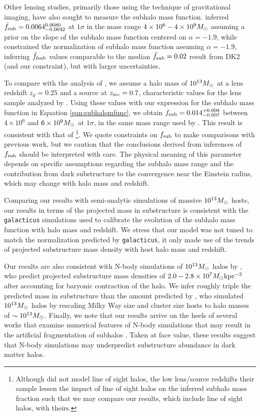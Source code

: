 Other lensing studies, primarily those using the technique of gravitational imaging, have also sought to measure the subhalo mass function. \cite{Veg++14} inferred ${\bar{f}_{\rm{sub}}}= 0.0064_{-0.0042}^{0.0080}$ at $1 \sigma$ in the mass range $4 \times 10^6 - 4 \times 10^9 {M_{\odot}}$ assuming a prior on the slope of the subhalo mass function centered on $\alpha = -1.9$, while \cite{Hezaveh++16} constrained the normalization of subhalo mass function assuming $\alpha = -1.9$, inferring $\bar{f}_{\rm{fsub}}$ values comparable to the median $\bar{f}_{\rm{sub}} = 0.02$ result from DK2 (and our constraint), but with larger uncertainties. 

To compare with the analysis of \cite{Veg++14}, we assume a halo mass of $10^{13}{M_{\odot}}$ at a lens redshift $z_d = 0.25$ and a source at $z_{\rm{src}} = 0.7$, characteristic values for the lens sample analyzed by \cite{Veg++14}. Using these values with our expression for the subhalo mass function in Equation \ref{eqn:subhalomfunc}, we obtain ${{f}_{\rm{sub}}}= 0.014_{-0.007}^{+0.008}$ between $4 \times 10^6$ and $6 \times 10^9 {M_{\odot}}$ at $1 \sigma$, in the same mass range used by \cite{Veg++14}. This result is consistent with that of \cite{Veg++14}\footnote{Although \cite{Veg++14} did not model line of sight halos, the low lens/source redshifts their sample lessen the impact of line of sight halos on the inferred subhalo mass fraction such that we may compare our results, which include line of sight halos, with theirs.}. We quote constraints on $f_{\rm{sub}}$ to make comparisons with previous work, but we caution that the conclusions derived from inferences of $f_{\rm{sub}}$ should be interpreted with care. The physical meaning of this parameter depends on specific assumptions regarding the subhalo mass range and the contribution from dark substructure to the convergence near the Einstein radius, which may change with halo mass and redshift. 

Comparing our results with semi-analytic simulations of massive $10^{13} {M_{\odot}}$ hosts, our results in terms of the projected mass in substructure is consistent with the {\tt{galacticus}} simulations used to calibrate the evolution of the subhalo mass function with halo mass and redshift. We stress that our model was not tuned to match the normalization predicted by {\tt{galacticus}}, it only made use of the trends of projected substructure mass density with host halo mass and redshift. 

Our results are also consistent with N-body simulations of $10^{13} {M_{\odot}}$ halos by \cite{Fiacconi++16}, who predict projected substructure mass densities of $2.0-2.8 \times 10^{7} {M_{\odot}} \rm{kpc^{-2}}$ after accounting for baryonic contraction of the halo. We infer roughly triple the predicted mass in substructure than the amount predicted by \cite{Xu++15}, who simulated $10^{13}{M_{\odot}}$ halos by rescaling Milky Way size and cluster size hosts to halo masses of $\sim 10^{13} {M_{\odot}}$. Finally, we note that our results arrive on the heels of several works that examine numerical features of N-body simulations that may result in the artificial fragmentation of subhalos \cite{vandenBosch++18,ErraniPenarrubia19}. Taken at face value, these results suggest that N-body simulations may underpredict substructure abundance in dark matter halos. 

